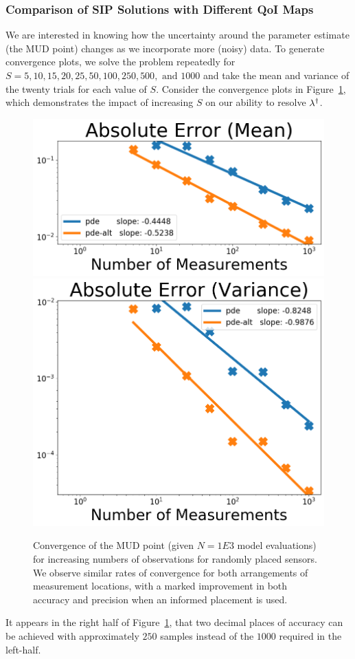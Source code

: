 \FloatBarrier
\subsubsection{Comparison of SIP Solutions with Different QoI Maps}

We are interested in knowing how the uncertainty around the parameter estimate (the MUD point) changes as we incorporate more (noisy) data.
To generate convergence plots, we solve the problem repeatedly for $S = 5, 10, 15, 20, 25, 50, 100, 250, 500, \text{ and } 1000$ and take the mean and variance of the twenty trials for each value of $S$.
Consider the convergence plots in Figure~\ref{fig:pde-convergence-obs}, which demonstrates the impact of increasing $S$ on our ability to resolve $\lambda^\dagger$.

\begin{figure}
  \centering
  \includegraphics[width=0.475\linewidth]{figures/pde/pde_convergence_mud_obs_mean}
  \includegraphics[width=0.475\linewidth]{figures/pde/pde_convergence_mud_obs_var}
  \caption{Convergence of the MUD point (given $N=1E3$ model evaluations) for increasing numbers of observations for randomly placed sensors.
  We observe similar rates of convergence for both arrangements of measurement locations, with a marked improvement in both accuracy and precision when an informed placement is used.
  }
  \label{fig:pde-convergence-obs}
\end{figure}

It appears in the right half of Figure~\ref{fig:pde-convergence-obs}, that two decimal places of accuracy can be achieved with approximately $250$ samples instead of the $1000$ required in the left-half.


